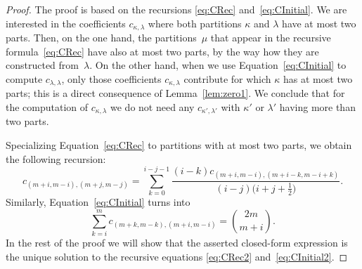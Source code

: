 \documentclass[10pt,oneside,american]{amsart}
\numberwithin{equation}{section}
\numberwithin{figure}{section}
\theoremstyle{definition}
\theoremstyle{remark}
\theoremstyle{plain}
\theoremstyle{definition}
\theoremstyle{plain}
\theoremstyle{plain}
\theoremstyle{plain}
\begin{document}
\begin{proof}
  The proof is based on the recursions \eqref{eq:CRec}
  and~\eqref{eq:CInitial}.  We are interested in the coefficients
  $c_{\kappa,\lambda}$ where both partitions $\kappa$ and $\lambda$ have at
  most two parts. Then, on the one hand, the partitions~$\mu$ that appear in
  the recursive formula~\eqref{eq:CRec} have also at most two parts, by the
  way how they are constructed from~$\lambda$. On the other hand, when we use
  Equation~\eqref{eq:CInitial} to compute $c_{\lambda,\lambda}$, only those
  coefficients $c_{\kappa,\lambda}$ contribute for which $\kappa$ has at most
  two parts; this is a direct consequence of Lemma~\ref{lem:zero1}.  We
  conclude that for the computation of $c_{\kappa,\lambda}$ we do not need any
  $c_{\kappa',\lambda'}$ with $\kappa'$ or $\lambda'$ having more than two
  parts.

  Specializing Equation~\eqref{eq:CRec} to partitions with at most two parts,
  we obtain the following recursion:
  \begin{equation}\label{eq:CRec2}
    c_{(m+i,m-i),(m+j,m-j)} = \sum_{k=0}^{i-j-1}
    \frac{(i - k) c_{(m+i,m-i),(m+i-k,m-i+k)}}{(i - j)\bigl(i + j + \frac12\bigr)}.
  \end{equation}
  Similarly, Equation~\eqref{eq:CInitial} turns into
  \begin{equation}\label{eq:CInitial2}
    \sum_{k=i}^m c_{(m+k,m-k),(m+i,m-i)} = \binom{2m}{m+i}.
  \end{equation}
  In the rest of the proof we will show that the asserted closed-form
  expression is the unique solution to the recursive equations
  \eqref{eq:CRec2} and~\eqref{eq:CInitial2}.


\end{proof}
\end{document}
